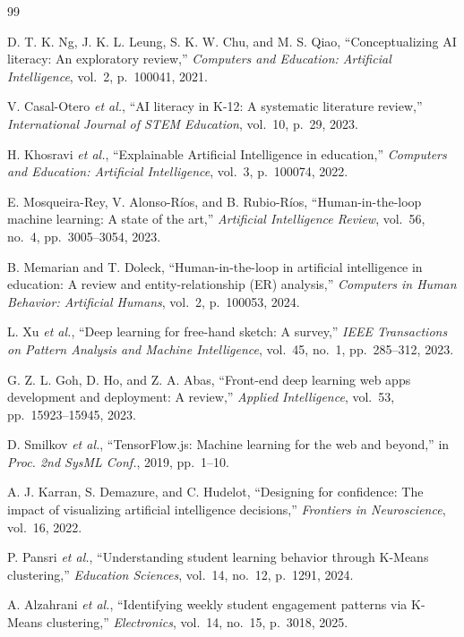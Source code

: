 \documentclass[12pt,a4paper,oneside,openany]{report}
\begin{document}
\begin{thebibliography}{99}

D. T. K. Ng, J. K. L. Leung, S. K. W. Chu, and M. S. Qiao, ``Conceptualizing AI literacy: An exploratory review,'' \textit{Computers and Education: Artificial Intelligence}, vol.~2, p.~100041, 2021.

V. Casal-Otero \textit{et al.}, ``AI literacy in K-12: A systematic literature review,'' \textit{International Journal of STEM Education}, vol.~10, p.~29, 2023.

H. Khosravi \textit{et al.}, ``Explainable Artificial Intelligence in education,'' \textit{Computers and Education: Artificial Intelligence}, vol.~3, p.~100074, 2022.

E. Mosqueira-Rey, V. Alonso-R\'ios, and B. Rubio-R\'ios, ``Human-in-the-loop machine learning: A state of the art,'' \textit{Artificial Intelligence Review}, vol.~56, no.~4, pp.~3005--3054, 2023.

B. Memarian and T. Doleck, ``Human-in-the-loop in artificial intelligence in education: A review and entity-relationship (ER) analysis,'' \textit{Computers in Human Behavior: Artificial Humans}, vol.~2, p.~100053, 2024.

L. Xu \textit{et al.}, ``Deep learning for free-hand sketch: A survey,'' \textit{IEEE Transactions on Pattern Analysis and Machine Intelligence}, vol.~45, no.~1, pp.~285--312, 2023.

G. Z. L. Goh, D. Ho, and Z. A. Abas, ``Front-end deep learning web apps development and deployment: A review,'' \textit{Applied Intelligence}, vol.~53, pp.~15923--15945, 2023.

D. Smilkov \textit{et al.}, ``TensorFlow.js: Machine learning for the web and beyond,'' in \textit{Proc. 2nd SysML Conf.}, 2019, pp.~1--10.

A. J. Karran, S. Demazure, and C. Hudelot, ``Designing for confidence: The impact of visualizing artificial intelligence decisions,'' \textit{Frontiers in Neuroscience}, vol.~16, 2022.

P. Pansri \textit{et al.}, ``Understanding student learning behavior through K-Means clustering,'' \textit{Education Sciences}, vol.~14, no.~12, p.~1291, 2024.

A. Alzahrani \textit{et al.}, ``Identifying weekly student engagement patterns via K-Means clustering,'' \textit{Electronics}, vol.~14, no.~15, p.~3018, 2025.


\end{thebibliography}
\end{document}
